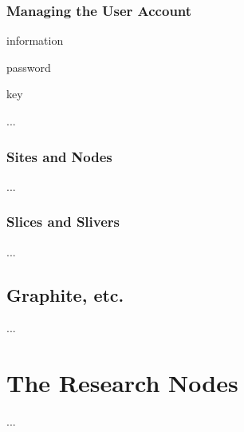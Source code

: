 \subsection{Managing the User Account}
\label{sub:Managing-the-Account}

information

password

key

...


\subsection{Sites and Nodes}
\label{sub:Sites-and-Nodes}

...


\subsection{Slices and Slivers}
\label{sub:Slices-and-Slivers}

...



\section{Graphite, etc.}
\label{sec:...}

...



\chapter{The Research Nodes}
\label{cha:Research-Nodes}

...

